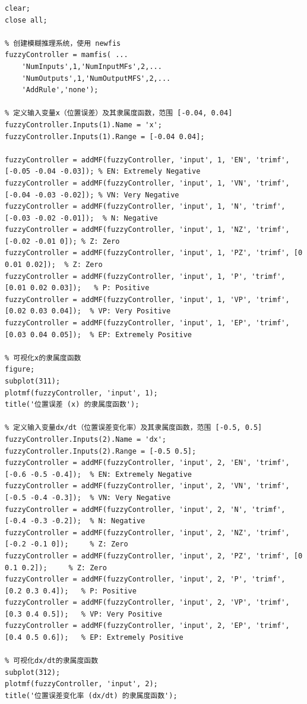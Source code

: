 \documentclass[12pt,a4paper,UTF8]{article}
\begin{document}
\begin{lstlisting}
clear;
close all;

% 创建模糊推理系统，使用 newfis
fuzzyController = mamfis( ...
    'NumInputs',1,'NumInputMFs',2,...
    'NumOutputs',1,'NumOutputMFS',2,...
    'AddRule','none');

% 定义输入变量x（位置误差）及其隶属度函数，范围 [-0.04, 0.04]
fuzzyController.Inputs(1).Name = 'x';
fuzzyController.Inputs(1).Range = [-0.04 0.04];

fuzzyController = addMF(fuzzyController, 'input', 1, 'EN', 'trimf', [-0.05 -0.04 -0.03]); % EN: Extremely Negative
fuzzyController = addMF(fuzzyController, 'input', 1, 'VN', 'trimf', [-0.04 -0.03 -0.02]); % VN: Very Negative
fuzzyController = addMF(fuzzyController, 'input', 1, 'N', 'trimf', [-0.03 -0.02 -0.01]);  % N: Negative
fuzzyController = addMF(fuzzyController, 'input', 1, 'NZ', 'trimf', [-0.02 -0.01 0]); % Z: Zero
fuzzyController = addMF(fuzzyController, 'input', 1, 'PZ', 'trimf', [0 0.01 0.02]);  % Z: Zero
fuzzyController = addMF(fuzzyController, 'input', 1, 'P', 'trimf', [0.01 0.02 0.03]);   % P: Positive
fuzzyController = addMF(fuzzyController, 'input', 1, 'VP', 'trimf', [0.02 0.03 0.04]);  % VP: Very Positive
fuzzyController = addMF(fuzzyController, 'input', 1, 'EP', 'trimf', [0.03 0.04 0.05]);  % EP: Extremely Positive

% 可视化x的隶属度函数
figure;
subplot(311);
plotmf(fuzzyController, 'input', 1);
title('位置误差 (x) 的隶属度函数');

% 定义输入变量dx/dt（位置误差变化率）及其隶属度函数，范围 [-0.5, 0.5]
fuzzyController.Inputs(2).Name = 'dx';
fuzzyController.Inputs(2).Range = [-0.5 0.5];
fuzzyController = addMF(fuzzyController, 'input', 2, 'EN', 'trimf', [-0.6 -0.5 -0.4]);  % EN: Extremely Negative
fuzzyController = addMF(fuzzyController, 'input', 2, 'VN', 'trimf', [-0.5 -0.4 -0.3]);  % VN: Very Negative
fuzzyController = addMF(fuzzyController, 'input', 2, 'N', 'trimf', [-0.4 -0.3 -0.2]);  % N: Negative
fuzzyController = addMF(fuzzyController, 'input', 2, 'NZ', 'trimf', [-0.2 -0.1 0]);     % Z: Zero
fuzzyController = addMF(fuzzyController, 'input', 2, 'PZ', 'trimf', [0 0.1 0.2]);     % Z: Zero
fuzzyController = addMF(fuzzyController, 'input', 2, 'P', 'trimf', [0.2 0.3 0.4]);   % P: Positive
fuzzyController = addMF(fuzzyController, 'input', 2, 'VP', 'trimf', [0.3 0.4 0.5]);   % VP: Very Positive
fuzzyController = addMF(fuzzyController, 'input', 2, 'EP', 'trimf', [0.4 0.5 0.6]);   % EP: Extremely Positive

% 可视化dx/dt的隶属度函数
subplot(312);
plotmf(fuzzyController, 'input', 2);
title('位置误差变化率 (dx/dt) 的隶属度函数');


\end{lstlisting}
\end{document}
